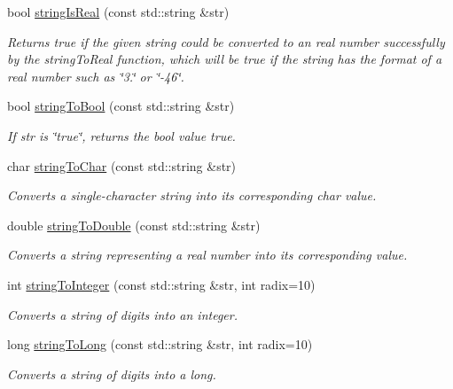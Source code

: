 \begin{DoxyCompactItemize}
bool \mbox{\hyperlink{namespacesgl_1_1priv_1_1strlib_a2b4e3df7dfde2e8c5e78cdf7b31e03ce}{string\+Is\+Real}} (const std\+::string \&str)
\begin{DoxyCompactList}\small\item\em Returns true if the given string could be converted to an real number successfully by the string\+To\+Real function, which will be true if the string has the format of a real number such as \char`\"{}3.\char`\"{} or \char`\"{}-\/46\char`\"{}. \end{DoxyCompactList}\item 
bool \mbox{\hyperlink{namespacesgl_1_1priv_1_1strlib_ad026739e163ac00059e145060cba9eec}{string\+To\+Bool}} (const std\+::string \&str)
\begin{DoxyCompactList}\small\item\em If str is \char`\"{}true\char`\"{}, returns the bool value true. \end{DoxyCompactList}\item 
char \mbox{\hyperlink{namespacesgl_1_1priv_1_1strlib_a7327a216701560fa447a513814916ecf}{string\+To\+Char}} (const std\+::string \&str)
\begin{DoxyCompactList}\small\item\em Converts a single-\/character string into its corresponding char value. \end{DoxyCompactList}\item 
double \mbox{\hyperlink{namespacesgl_1_1priv_1_1strlib_ab45e289eae123f82e9155b01ec636710}{string\+To\+Double}} (const std\+::string \&str)
\begin{DoxyCompactList}\small\item\em Converts a string representing a real number into its corresponding value. \end{DoxyCompactList}\item 
int \mbox{\hyperlink{namespacesgl_1_1priv_1_1strlib_a8c234a839fbe3556e1b7b1d93b92b1e6}{string\+To\+Integer}} (const std\+::string \&str, int radix=10)
\begin{DoxyCompactList}\small\item\em Converts a string of digits into an integer. \end{DoxyCompactList}\item 
long \mbox{\hyperlink{namespacesgl_1_1priv_1_1strlib_a1e7f514d7bb739231262e4a267b53184}{string\+To\+Long}} (const std\+::string \&str, int radix=10)
\begin{DoxyCompactList}\small\item\em Converts a string of digits into a long. \end{DoxyCompactList}\item 

\end{DoxyCompactItemize}
